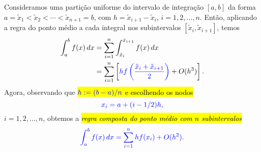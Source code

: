 Consideramos uma partição uniforme do intervalo de integração $[a, b]$ da forma $a=\tilde{x}_1 < \tilde{x}_2 < \cdots < \tilde{x}_{n+1}=b$, com $h=\tilde{x}_{i+1}-\tilde{x}_{i}$, $i=1, 2, \dotsc, n$. Então, aplicando a regra do ponto médio a cada integral nos subintervalos $[\tilde{x}_i, \tilde{x}_{i+1}]$, temos
\begin{align}
  \int_a^b f(x)\,dx &= \sum_{i=1}^{n}\int_{\tilde{x}_i}^{\tilde{x}_{i+1}}f(x)\,dx\\
  &= \sum_{i=1}^n \left[{\color{blue}hf\left(\frac{\tilde{x}_i+\tilde{x}_{i+1}}{2}\right)} + O(h^3)\right].
\end{align}
Agora, observando que \hl{$\color{blue}h:=(b-a)/n$ e escolhendo os nodos}
\begin{equation}\color{blue}x_i = a + (i - 1/2)h,
\end{equation}
  $i=1, 2, \dotsc, n$, obtemos a \hl{\emph{regra composta do ponto médio com $n$ subintervalos}}
\begin{equation}\color{blue}\int_a^b f(x)\,dx = \sum_{i=1}^n hf(x_i) + O(h^2).
\end{equation}

